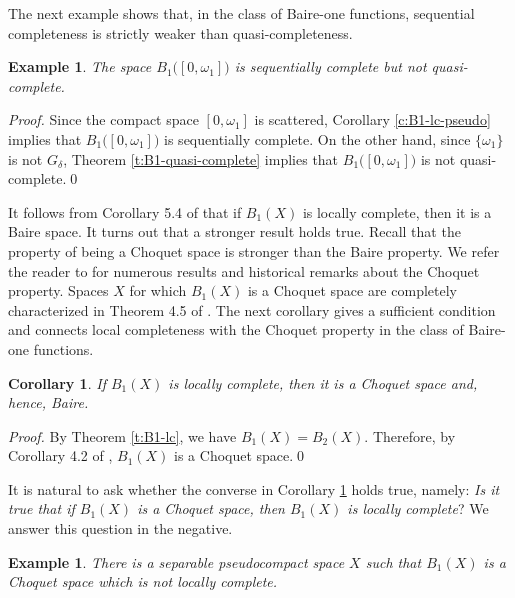 \documentclass[preprint,11pt]{elsarticle}
\newtheorem{corollary}[theorem]{Corollary}
\newtheorem{example}[theorem]{Example}
\numberwithin{equation}{section}
\numberwithin{theorem}{section}
\newcommand{\w}{\omega}
\begin{document}
The next example shows that, in the class of Baire-one functions, sequential completeness is strictly weaker than quasi-completeness.
\begin{example} \label{exa:B1-sc-not-qc}
The space $B_1\big([0,\w_1]\big)$ is sequentially complete but not quasi-complete.
\end{example}

\begin{proof}
Since the compact space $[0,\w_1]$ is scattered, Corollary \ref{c:B1-lc-pseudo} implies that $B_1\big([0,\w_1]\big)$ is sequentially complete. On the other hand, since $\{\w_1\}$ is not $G_\delta$, Theorem \ref{t:B1-quasi-complete} implies that $B_1\big([0,\w_1]\big)$ is not quasi-complete.\qed
\end{proof}



It follows from Corollary 5.4 %
of \cite{GOR-kFU} that if $B_1(X)$ is locally complete, then it is a Baire space. It turns out that a stronger result holds true. Recall that the property of being a Choquet space is stronger than the Baire property. We refer the reader to \cite{BG-Baire} for numerous results and historical remarks about the Choquet property. Spaces $X$  for which $B_1(X)$ is a Choquet space are completely characterized in Theorem 4.5 of \cite{Osipov-251}. The next corollary gives a sufficient condition and connects local completeness with the  Choquet property in the class of Baire-one functions.


\begin{corollary} \label{c:B1-lc-Choquet}
If $B_1(X)$ is locally complete, then it is a Choquet space and, hence, Baire.
\end{corollary}

\begin{proof}
By Theorem \ref{t:B1-lc}, we have $B_1(X)=B_2(X)$. Therefore, by Corollary 4.2 of \cite{BG-Baire}, $B_1(X)$ is a Choquet space.\qed
\end{proof}


It is natural to ask whether the converse in Corollary \ref{c:B1-lc-Choquet} holds true, namely: {\em Is it true that if $B_1(X)$ is a Choquet space, then $B_1(X)$ is locally complete}? We answer this question in the negative.

\begin{example}\label{exa:B1-Choquet-not-lc}
There is a separable pseudocompact space $X$ such that $B_1(X)$ is a Choquet space which is not locally complete.
\end{example}
\end{document}
